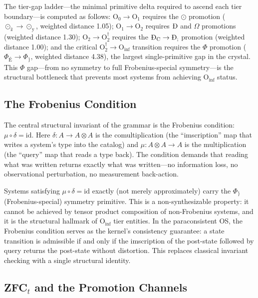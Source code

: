 \documentclass[12pt,a4paper]{article}
\begin{document}
The tier-gap ladder---the minimal primitive delta required to ascend each tier
boundary---is computed as follows: $\text{O}_0 \to \text{O}_1$ requires the
$\odot$ promotion ($\odot_{\text{\v{z}}} \to \odot_{\text{\"y}}$, weighted
distance 1.05); $\text{O}_1 \to \text{O}_2$ requires $\text{\DH}$ and $\Omega$
promotions (weighted distance 1.30); $\text{O}_2 \to \text{O}_2^{\dagger}$
requires the $\text{\DH}_{\text{C}} \to \text{\DH}_{\text{;}}$ promotion
(weighted distance 1.00); and the critical $\text{O}_2^{\dagger} \to
\text{O}_{\text{inf}}$ transition requires the $\Phi$ promotion
($\Phi_{\text{É}} \to \Phi_{\text{\}}}$, weighted distance 4.38), the largest
single-primitive gap in the crystal. This $\Phi$ gap---from no symmetry to full
Frobenius-special symmetry---is the structural bottleneck that prevents most
systems from achieving $\text{O}_{\text{inf}}$ status.

\subsection{The Frobenius Condition}

The central structural invariant of the grammar is the Frobenius condition:
$\mu \circ \delta = \mathrm{id}$. Here $\delta: A \to A \otimes A$ is the
comultiplication (the ``imscription'' map that writes a system's type into
the catalog) and $\mu: A \otimes A \to A$ is the multiplication (the
``query'' map that reads a type back). The condition demands that reading
what was written returns exactly what was written---no information loss,
no observational perturbation, no measurement back-action.

Systems satisfying $\mu \circ \delta = \mathrm{id}$ exactly (not merely
approximately) carry the $\Phi_{\text{\}}}$ (Frobenius-special) symmetry
primitive. This is a non-synthesizable property: it cannot be achieved by
tensor product composition of non-Frobenius systems, and it is the
structural hallmark of $\text{O}_{\text{inf}}$ tier entities. In the
paraconsistent OS, the Frobenius condition serves as the kernel's
consistency guarantee: a state transition is admissible if and only if
the imscription of the post-state followed by query returns the post-state
without distortion. This replaces classical invariant checking with a
single structural identity.

\subsection{ZFC${}_t$ and the Promotion Channels}
\end{document}
